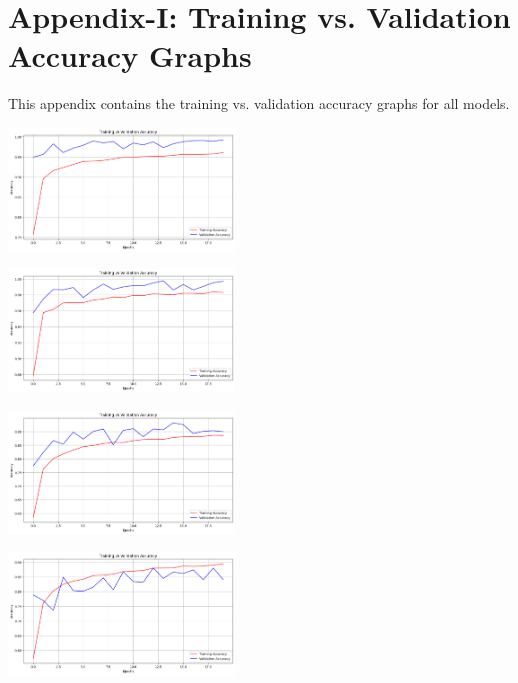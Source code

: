 \chapter*{Appendix-I: Training vs. Validation Accuracy Graphs}

\noindent This appendix contains the training vs. validation accuracy graphs for all models.

\begin{multicols}{2}
\centering

\includegraphics[width=0.45\textwidth]{Assets/validation_accuracy/vgg19.png}

\vspace{0.5cm}

\includegraphics[width=0.45\textwidth]{Assets/validation_accuracy/CONVNEXTBASE.png}

\vspace{0.5cm}

\includegraphics[width=0.45\textwidth]{Assets/validation_accuracy/DENSENET121.png}

\vspace{0.5cm}

\includegraphics[width=0.45\textwidth]{Assets/validation_accuracy/DenseNet169.png}


\end{multicols}
